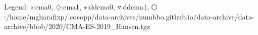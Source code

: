 Legend: {\color{NavyBlue}$\circ$}:cma0, {\color{Magenta}$\diamondsuit$}:cma1, {\color{Orange}$\star$}:ddcma0, {\color{CornflowerBlue}$\triangledown$}:ddcma1, {\color{red}$\varhexagon$}:/home/mgharafixp/.cocopp/data-archives/numbbo.github.io/data-archive/data-archive/bbob/2020/CMA-ES-2019\_Hansen.tgz